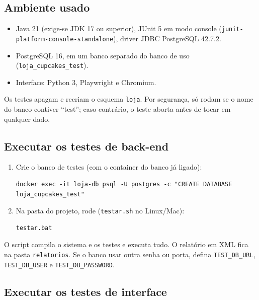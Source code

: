 \documentclass[12pt]{article}
\begin{document}
\subsection{Ambiente usado}

\begin{itemize}
\item Java 21 (exige-se JDK 17 ou superior), JUnit 5 em modo console (\texttt{junit-platform-console-standalone}), driver JDBC PostgreSQL 42.7.2.
\item PostgreSQL 16, em um banco separado do banco de uso (\texttt{loja\_cupcakes\_test}).
\item Interface: Python 3, Playwright e Chromium.
\end{itemize}

\begin{dica}
Os testes apagam e recriam o esquema \texttt{loja}. Por segurança, só rodam se o nome do banco contiver ``test''; caso contrário, o teste aborta antes de tocar em qualquer dado.
\end{dica}

\subsection{Executar os testes de back-end}

\begin{enumerate}
\item Crie o banco de testes (com o container do banco já ligado):
\begin{Verbatim}[fontsize=\footnotesize, frame=single]
docker exec -it loja-db psql -U postgres -c "CREATE DATABASE loja_cupcakes_test"
\end{Verbatim}
\item Na pasta do projeto, rode (\texttt{testar.sh} no Linux/Mac):
\begin{Verbatim}[fontsize=\footnotesize, frame=single]
testar.bat
\end{Verbatim}
\end{enumerate}

O script compila o sistema e os testes e executa tudo. O relatório em XML fica na pasta \texttt{relatorios}. Se o banco usar outra senha ou porta, defina \texttt{TEST\_DB\_URL}, \texttt{TEST\_DB\_USER} e \texttt{TEST\_DB\_PASSWORD}.

\subsection{Executar os testes de interface}
\end{document}
